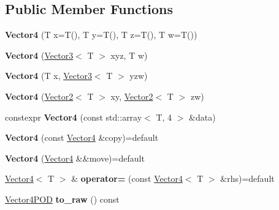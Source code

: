 \subsection*{Public Member Functions}
\begin{DoxyCompactItemize}
\item 
\mbox{\label{class_vector4_ac154b1e69f61ce75d8d25d1c279f5402}} 
{\bfseries Vector4} (T x=T(), T y=T(), T z=T(), T w=T())
\item 
\mbox{\label{class_vector4_a557eb530e0204fdfb0ed13f140779e8b}} 
{\bfseries Vector4} (\mbox{\hyperlink{class_vector3}{Vector3}}$<$ T $>$ xyz, T w)
\item 
\mbox{\label{class_vector4_acec4f588fb417a8a96093fe8b6244239}} 
{\bfseries Vector4} (T x, \mbox{\hyperlink{class_vector3}{Vector3}}$<$ T $>$ yzw)
\item 
\mbox{\label{class_vector4_a608abeb8aef0837b6c4bf2f2d3591952}} 
{\bfseries Vector4} (\mbox{\hyperlink{class_vector2}{Vector2}}$<$ T $>$ xy, \mbox{\hyperlink{class_vector2}{Vector2}}$<$ T $>$ zw)
\item 
\mbox{\label{class_vector4_a2503315a6418e38bf423c9fb7b33eec3}} 
constexpr {\bfseries Vector4} (const std\+::array$<$ T, 4 $>$ \&data)
\item 
\mbox{\label{class_vector4_af3160e6a7223cc6ad3e971f09e90f4c9}} 
{\bfseries Vector4} (const \mbox{\hyperlink{class_vector4}{Vector4}} \&copy)=default
\item 
\mbox{\label{class_vector4_a1df9540b6f2286eea537bcaa671048e0}} 
{\bfseries Vector4} (\mbox{\hyperlink{class_vector4}{Vector4}} \&\&move)=default
\item 
\mbox{\label{class_vector4_aaa3a4a49881c4496b59d406d81b1a3eb}} 
\mbox{\hyperlink{class_vector4}{Vector4}}$<$ T $>$ \& {\bfseries operator=} (const \mbox{\hyperlink{class_vector4}{Vector4}}$<$ T $>$ \&rhs)=default
\item 
\mbox{\label{class_vector4_a4fea99cf190d3d29f9aaa36acd07a49a}} 
\mbox{\hyperlink{struct_vector4_p_o_d}{Vector4\+P\+OD}} {\bfseries to\+\_\+raw} () const

\end{DoxyCompactItemize}
